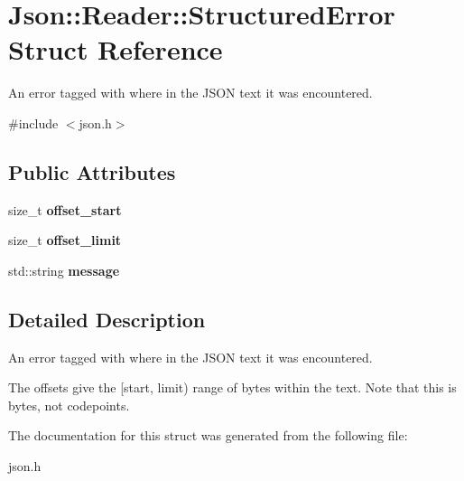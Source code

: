 \hypertarget{struct_json_1_1_reader_1_1_structured_error}{\section{Json\-:\-:Reader\-:\-:Structured\-Error Struct Reference}
\label{struct_json_1_1_reader_1_1_structured_error}
}


An error tagged with where in the J\-S\-O\-N text it was encountered.  




{\ttfamily \#include $<$json.\-h$>$}

\subsection*{Public Attributes}
\begin{DoxyCompactItemize}
\item 
\hypertarget{struct_json_1_1_reader_1_1_structured_error_a160dae4eb3464a2209b743c755baf65f}{size\-\_\-t {\bfseries offset\-\_\-start}}\label{struct_json_1_1_reader_1_1_structured_error_a160dae4eb3464a2209b743c755baf65f}

\item 
\hypertarget{struct_json_1_1_reader_1_1_structured_error_a80747dae744bcc80a9bc81c94fd42e13}{size\-\_\-t {\bfseries offset\-\_\-limit}}\label{struct_json_1_1_reader_1_1_structured_error_a80747dae744bcc80a9bc81c94fd42e13}

\item 
\hypertarget{struct_json_1_1_reader_1_1_structured_error_ab8755e5201b78c6ae077338f8819e6e6}{std\-::string {\bfseries message}}\label{struct_json_1_1_reader_1_1_structured_error_ab8755e5201b78c6ae077338f8819e6e6}

\end{DoxyCompactItemize}


\subsection{Detailed Description}
An error tagged with where in the J\-S\-O\-N text it was encountered. 

The offsets give the \mbox{[}start, limit) range of bytes within the text. Note that this is bytes, not codepoints. 

The documentation for this struct was generated from the following file\-:\begin{DoxyCompactItemize}
\item 
json.\-h\end{DoxyCompactItemize}
